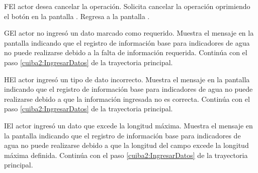     \begin{UCtrayectoriaA}{F}{El actor desea cancelar la operación.}
    \UCpaso[\UCactor] Solicita cancelar la operación oprimiendo el botón  en la pantalla .
    \UCpaso[] Regresa a la pantalla . 
    \end{UCtrayectoriaA}
  
    \begin{UCtrayectoriaA}{G}{El actor no ingresó un dato marcado como requerido.}    
    \UCpaso[\UCsist] Muestra el mensaje  en la pantalla  indicando que el registro de información base para indicadores de agua no puede realizarse debido a la falta de información requerida.
    \UCpaso[] Continúa con el paso \ref{cuiba2:IngresarDatos} de la trayectoria principal.     
    \end{UCtrayectoriaA}
 
        \begin{UCtrayectoriaA}{H}{El actor ingresó un tipo de dato incorrecto.}    
    \UCpaso[\UCsist] Muestra el mensaje  en la pantalla  indicando que el registro de información base para indicadores de agua no puede realizarse debido a que la información ingresada no es correcta.
    \UCpaso[] Continúa con el paso \ref{cuiba2:IngresarDatos} de la trayectoria principal.     
    \end{UCtrayectoriaA}
    
            \begin{UCtrayectoriaA}{I}{El actor ingresó un dato que excede la longitud máxima.}    
    \UCpaso[\UCsist] Muestra el mensaje  en la pantalla  indicando que el registro de información base para indicadores de agua no puede realizarse debido a que la longitud del campo excede la longitud máxima definida.
    \UCpaso[] Continúa con el paso \ref{cuiba2:IngresarDatos} de la trayectoria principal.     
    \end{UCtrayectoriaA}